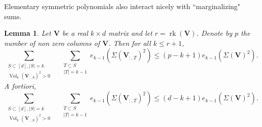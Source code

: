 \documentclass[twoside,11pt]{book}
\newtheorem{lemma}{Lemma}
\numberwithin{theorem}{chapter}
\numberwithin{definition}{chapter}
\numberwithin{proposition}{chapter}
\numberwithin{corollary}{chapter}
\numberwithin{example}{chapter}
\numberwithin{lemma}{chapter}
\numberwithin{assumption}{chapter}
\DeclareMathOperator{\rank}{\mathrm{rk}}
\DeclareMathOperator{\Vol}{Vol}
\begin{document}
Elementary symmetric polynomials also interact nicely with ``marginalizing" sums.
\begin{lemma}\label{sum_k_1_symmetric_poly_det_lemma}
Let $\bm{V}$ be a real $k \times d$ matrix and let $ r = \rank(\bm{V})$. Denote by $p$ the number of non zero columns of $\bm{V}$. Then for all $k\leq r+1$,
\begin{equation}
    \sum\limits_{\substack{S \subset [d], |S| = k\\\Vol_{k}(\bm{V}_{:,S})^{2} >0}} \quad \sum\limits_{\substack{T \subset S \\ |T| = k-1}} e_{k-1}(\Sigma(\bm{V}_{:,T})^{2}) \leq (p-k+1)e_{k-1}(\Sigma(\bm{V})^{2}).
\end{equation}
A fortiori,
\begin{equation}
    \sum\limits_{\substack{S \subset [d], |S| = k\\\Vol_{k}(\bm{V}_{:,S})^{2} >0}} \quad \sum\limits_{\substack{T \subset S \\ |T| = k-1}} e_{k-1}(\Sigma(\bm{V}_{:,T})^{2}) \leq (d-k+1)e_{k-1}(\Sigma(\bm{V})^{2}).
\end{equation}
\end{lemma}
\end{document}
